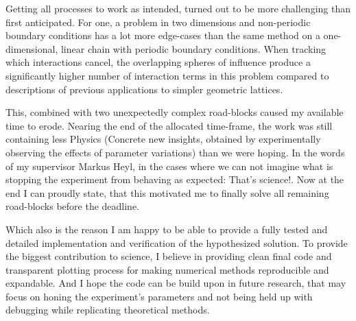 Getting all processes to work as intended, turned out to be more challenging than first anticipated.
For one, a problem in two dimensions and non-periodic boundary conditions has a lot more edge-cases than the same method on a one-dimensional, linear chain with periodic boundary conditions.
When tracking which interactions cancel, the overlapping \glqq spheres of influence\grqq{} produce a significantly higher number of interaction terms in this problem compared to descriptions of previous applications to simpler geometric lattices.

This, combined with two unexpectedly complex road-blocks caused my available time to erode.
Nearing the end of the allocated time-frame, the work was still containing less \glqq Physics\grqq{} (Concrete new insights, obtained by experimentally observing the effects of parameter variations) than we were hoping.
In the words of my supervisor Markus Heyl, in the cases where we can not imagine what is stopping the experiment from behaving as expected: \glqq That's science!\grqq{}.
Now at the end I can proudly state, that this motivated me to finally solve all remaining road-blocks before the deadline.

Which also is the reason I am happy to be able to provide a fully tested and detailed implementation and verification of the hypothesized solution.
To provide the biggest contribution to science, I believe in providing clean final code and transparent plotting process for making numerical methods reproducible and expandable.
And I hope the code can be build upon in future research, that may focus on honing the experiment's parameters and not being held up with debugging while replicating theoretical methods.

